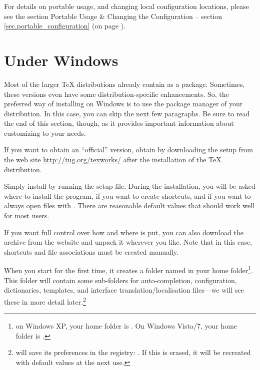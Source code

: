 For details on portable usage, and changing local configuration locations, please see the section Portable Usage \& Changing the Configuration -- section \ref{sec.portable_configuration} (on page \pageref{sec.portable_configuration}).

\section{Under Windows}

Most of the larger {\TeX} distributions already contain {\Tw} as a package. Sometimes, these versions even have some distribution-specific enhancements. So, the preferred way of installing {\Tw} on Windows is to use the package manager of your distribution. In this case, you can skip the next few paragraphs. Be sure to read the end of this section, though, as it provides important information about customizing {\Tw} to your needs.

If you want to obtain an ``official'' version, obtain {\Tw} by downloading the setup from the {\Tw} web site \url{http://tug.org/texworks/} after the installation of the {\TeX} distribution.

Simply install {\Tw} by running the setup file. During the installation, you will be asked where to install the program, if you want to create shortcuts, and if you want to always open  files with {\Tw}. There are reasonable default values that should work well for most users.

If you want full control over how and where {\Tw} is put, you can also download the  archive from the website and unpack it wherever you like. Note that in this case, shortcuts and file associations must be created manually.

\urldef{\TwRegistryPath}

When you start {\Tw} for the first time, it creates a folder named  in your home folder\footnote{on Windows XP, your home folder is . On Windows Vista/7, your home folder is .}. This folder will contain some sub-folders for auto-completion, configuration, dictionaries, templates, and interface translation/localisation files---we will see these in more detail later.\footnote{{\Tw} will save its preferences in the registry:
\TwRegistryPath. If this is erased, it will be recreated with default values at the next use.}

